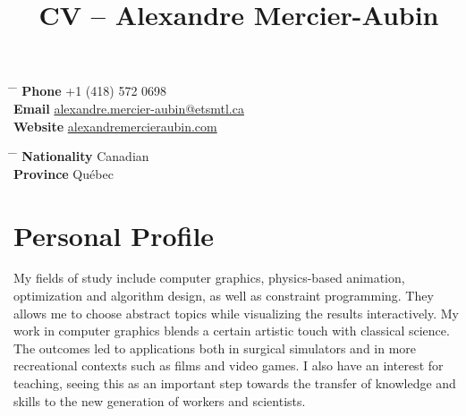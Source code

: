\documentclass[10pt]{article} %
\begin{document}

\title{CV -- Alexandre Mercier-Aubin} %


\parbox{0.5\textwidth}{ %
\begin{tabbing} %
\hspace{3cm} \= \hspace{4cm} \= \kill %
{\bf Phone} \> +1 (418) 572 0698 \\ %
{\bf Email} \> \href{mailto:alexandre.mercier-aubin@etsmtl.ca}{alexandre.mercier-aubin@etsmtl.ca} \\ %
{\bf Website} \> \href{https://alexandremercieraubin.com}{alexandremercieraubin.com} \\
\end{tabbing}}
\hfill %
\parbox{0.5\textwidth}{ %
\begin{tabbing} %
\hspace{3cm} \= \hspace{4cm} \= \kill %
{\bf Nationality} \> Canadian \\ %
{\bf Province} \> {Québec}\\
\end{tabbing}}

\vspace{-0.7cm} 

\justifying


\section{Personal Profile}

My fields of study include computer graphics, physics-based animation, optimization and algorithm design, as well as constraint programming. They allows me to choose abstract topics while visualizing the results interactively. My work in computer graphics blends a certain artistic touch with classical science. The outcomes led to applications both in surgical simulators and in more recreational contexts such as films and video games. I also have an interest for teaching, seeing this as an important step towards the transfer of knowledge and skills to the new generation of workers and scientists.
\end{document}
